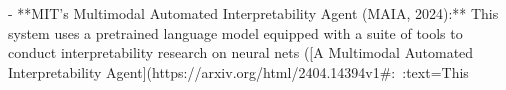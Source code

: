 - **MIT’s Multimodal Automated Interpretability Agent (MAIA, 2024):** This system uses a pretrained language model equipped with a suite of tools to conduct interpretability research on neural nets ([A Multimodal Automated Interpretability Agent](https://arxiv.org/html/2404.14394v1#:~:text=This%
